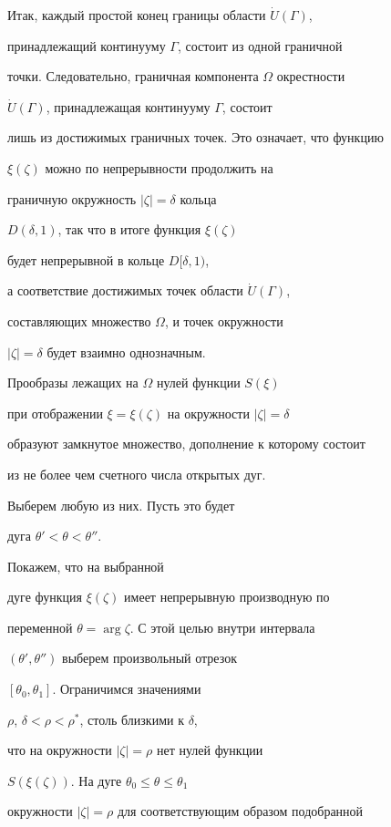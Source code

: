 \begin{pf}
Итак, каждый простой конец границы области $\Dot{U}(\Gamma)$, 


принадлежащий континууму $\Gamma$, состоит из одной граничной 


точки. Следовательно, граничная компонента $\Omega$ окрестности 


$\Dot{U}(\Gamma)$, принадлежащая континууму $\Gamma$, состоит 


лишь из достижимых граничных точек. Это означает, что функцию


$\xi(\zeta)$ можно по непрерывности продолжить на


граничную окружность $|\zeta|=\delta$ кольца 


$D(\delta,1)$, так что в итоге функция $\xi(\zeta)$ 


будет непрерывной в кольце $D[\delta,1)$,


а соответствие достижимых точек области $\Dot{U}(\Gamma)$,


составляющих множество $\Omega$, и точек окружности 


$|\zeta|=\delta$ будет взаимно однозначным.   


Прообразы лежащих на $\Omega$ нулей функции $S(\xi)$ 


при отображении $\xi=\xi(\zeta)$ на окружности $|\zeta|=\delta$ 


образуют замкнутое множество, дополнение к которому состоит


из не более чем счетного числа открытых дуг. 


Выберем любую из них. Пусть это будет


дуга $\theta'<\theta<\theta''$. 





Покажем, что на выбранной


дуге функция $\xi(\zeta)$ имеет непрерывную производную по


переменной $\theta=\arg\zeta$. С этой целью внутри интервала


$(\theta',\theta'')$ выберем произвольный отрезок 


$[\theta_{0},\theta_{1}]$. Ограничимся значениями 


$\rho$, $\delta<\rho<\rho^{*}$, столь близкими к $\delta$,


что на окружности $|\zeta|=\rho$ нет нулей функции


$S(\xi(\zeta))$. На дуге $\theta_{0}\le\theta\le\theta_{1}$


окружности $|\zeta|=\rho$ для соответствующим образом подобранной



\end{pf}
